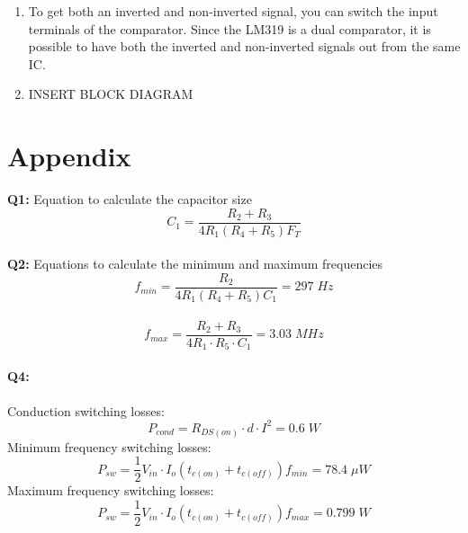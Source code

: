 \documentclass[a4paper,11pt]{article}
\begin{document}
\begin{preview}
\begin{enumerate}
    
    \item To get both an inverted and non-inverted signal, you can switch the input terminals of the comparator. Since the LM319 is a dual comparator, it is possible to have both the inverted and non-inverted signals out from the same IC. \\
    

    \item INSERT BLOCK DIAGRAM


\end{enumerate}

\section*{Appendix}

\textbf{Q1:} Equation to calculate the capacitor size
$$ C_{1}=\frac{R_{2}+R_{3}}{4R_{1}\left(R_{4}+R_{5}\right)F_{T}} $$\\

\textbf{Q2:} Equations to calculate the minimum and maximum frequencies
$$ f_{min}=\frac{R_{2}}{4R_{1}\left(R_{4}+R_{5}\right)C_{1}} = 297\;Hz $$ \\
$$ f_{max}=\frac{R_{2}+R_{3}}{4R_{1}\cdot R_{5}\cdot C_{1}} = 3.03\;MHz $$\\

\textbf{Q4:} \\\\
Conduction switching losses:
$$ P_{cond} = R_{DS(on)} \cdot d \cdot I^2 = 0.6\;W $$
Minimum frequency switching losses:
$$ P_{sw} = \frac{1}{2}V_{in} \cdot I_o (t_{c(on)} + t_{c(off)})f_{min} = 78.4 \;\mu W $$
Maximum frequency switching losses:
$$ P_{sw} = \frac{1}{2}V_{in} \cdot I_o (t_{c(on)} + t_{c(off)})f_{max} = 0.799 \; W $$


\end{preview}
\end{document}
